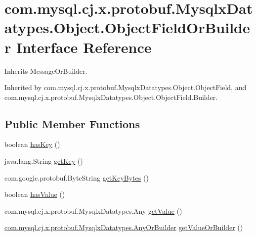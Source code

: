 \hypertarget{interfacecom_1_1mysql_1_1cj_1_1x_1_1protobuf_1_1_mysqlx_datatypes_1_1_object_1_1_object_field_or_builder}{}\section{com.\+mysql.\+cj.\+x.\+protobuf.\+Mysqlx\+Datatypes.\+Object.\+Object\+Field\+Or\+Builder Interface Reference}
\label{interfacecom_1_1mysql_1_1cj_1_1x_1_1protobuf_1_1_mysqlx_datatypes_1_1_object_1_1_object_field_or_builder}


Inherits Message\+Or\+Builder.



Inherited by com.\+mysql.\+cj.\+x.\+protobuf.\+Mysqlx\+Datatypes.\+Object.\+Object\+Field, and com.\+mysql.\+cj.\+x.\+protobuf.\+Mysqlx\+Datatypes.\+Object.\+Object\+Field.\+Builder.

\subsection*{Public Member Functions}
\begin{DoxyCompactItemize}
\item 
boolean \mbox{\hyperlink{interfacecom_1_1mysql_1_1cj_1_1x_1_1protobuf_1_1_mysqlx_datatypes_1_1_object_1_1_object_field_or_builder_a64365d41fdbe9f0b2b0dbafe4b093626}{has\+Key}} ()
\item 
java.\+lang.\+String \mbox{\hyperlink{interfacecom_1_1mysql_1_1cj_1_1x_1_1protobuf_1_1_mysqlx_datatypes_1_1_object_1_1_object_field_or_builder_ac0a30c22262d3cde5e45ebbb3d30157c}{get\+Key}} ()
\item 
com.\+google.\+protobuf.\+Byte\+String \mbox{\hyperlink{interfacecom_1_1mysql_1_1cj_1_1x_1_1protobuf_1_1_mysqlx_datatypes_1_1_object_1_1_object_field_or_builder_a08ef64551199dbcdfba24581e67fbdfd}{get\+Key\+Bytes}} ()
\item 
boolean \mbox{\hyperlink{interfacecom_1_1mysql_1_1cj_1_1x_1_1protobuf_1_1_mysqlx_datatypes_1_1_object_1_1_object_field_or_builder_abdfe4f7a88280b3a7f9473a625023cbb}{has\+Value}} ()
\item 
com.\+mysql.\+cj.\+x.\+protobuf.\+Mysqlx\+Datatypes.\+Any \mbox{\hyperlink{interfacecom_1_1mysql_1_1cj_1_1x_1_1protobuf_1_1_mysqlx_datatypes_1_1_object_1_1_object_field_or_builder_a2acfc2008e436a6b1a88c79191d093ca}{get\+Value}} ()
\item 
\mbox{\hyperlink{interfacecom_1_1mysql_1_1cj_1_1x_1_1protobuf_1_1_mysqlx_datatypes_1_1_any_or_builder}{com.\+mysql.\+cj.\+x.\+protobuf.\+Mysqlx\+Datatypes.\+Any\+Or\+Builder}} \mbox{\hyperlink{interfacecom_1_1mysql_1_1cj_1_1x_1_1protobuf_1_1_mysqlx_datatypes_1_1_object_1_1_object_field_or_builder_a0ebcd369a10243c39c66e4bde2847c27}{get\+Value\+Or\+Builder}} ()
\end{DoxyCompactItemize}


